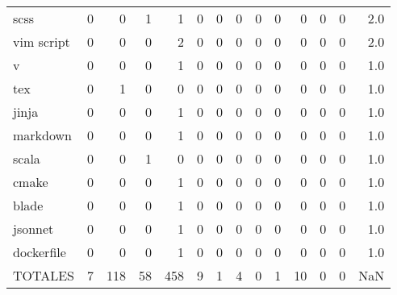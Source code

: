 \begin{tabular}{lrrrrrrrrrrrrr}
scss             &        0 &       0 &          1 &               1 &                0 &       0 &          0 &         0 &         0 &      0 &             0 &         0 &      2.0 \\
vim script       &        0 &       0 &          0 &               2 &                0 &       0 &          0 &         0 &         0 &      0 &             0 &         0 &      2.0 \\
v                &        0 &       0 &          0 &               1 &                0 &       0 &          0 &         0 &         0 &      0 &             0 &         0 &      1.0 \\
tex              &        0 &       1 &          0 &               0 &                0 &       0 &          0 &         0 &         0 &      0 &             0 &         0 &      1.0 \\
jinja            &        0 &       0 &          0 &               1 &                0 &       0 &          0 &         0 &         0 &      0 &             0 &         0 &      1.0 \\
markdown         &        0 &       0 &          0 &               1 &                0 &       0 &          0 &         0 &         0 &      0 &             0 &         0 &      1.0 \\
scala            &        0 &       0 &          1 &               0 &                0 &       0 &          0 &         0 &         0 &      0 &             0 &         0 &      1.0 \\
cmake            &        0 &       0 &          0 &               1 &                0 &       0 &          0 &         0 &         0 &      0 &             0 &         0 &      1.0 \\
blade            &        0 &       0 &          0 &               1 &                0 &       0 &          0 &         0 &         0 &      0 &             0 &         0 &      1.0 \\
jsonnet          &        0 &       0 &          0 &               1 &                0 &       0 &          0 &         0 &         0 &      0 &             0 &         0 &      1.0 \\
dockerfile       &        0 &       0 &          0 &               1 &                0 &       0 &          0 &         0 &         0 &      0 &             0 &         0 &      1.0 \\
TOTALES          &        7 &     118 &         58 &             458 &                9 &       1 &          4 &         0 &         1 &     10 &             0 &         0 &      NaN \\
\bottomrule
\end{tabular}

